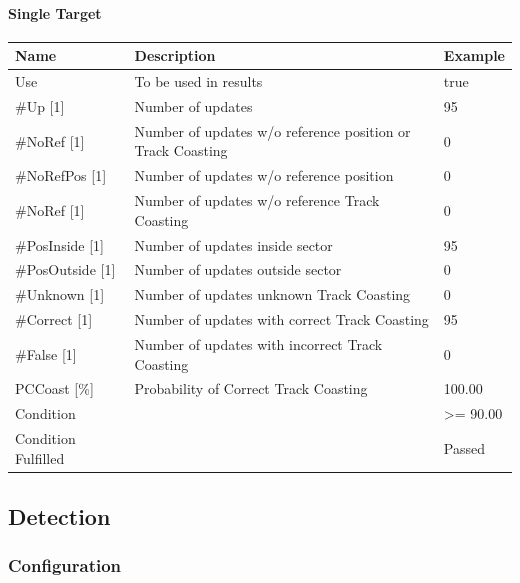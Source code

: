 \paragraph{Single Target}

\begin{center}
 \begin{table}[H]
  \begin{tabularx}{\textwidth}{ | l | X |  l | }
    \hline
    \textbf{Name} & \textbf{Description} & \textbf{Example} \\ \hline
  Use & To be used in results & true \\ \hline
  \#Up [1] & Number of updates & 95 \\ \hline
  \#NoRef [1] & Number of updates w/o reference position or Track Coasting & 0 \\ \hline
  \#NoRefPos [1] & Number of updates w/o reference position  & 0 \\ \hline
  \#NoRef [1] & Number of updates w/o reference Track Coasting & 0 \\ \hline
  \#PosInside [1] & Number of updates inside sector & 95 \\ \hline
  \#PosOutside [1] & Number of updates outside sector & 0 \\ \hline
  \#Unknown [1] & Number of updates unknown Track Coasting & 0 \\ \hline
  \#Correct [1] & Number of updates with correct Track Coasting & 95 \\ \hline
  \#False [1] & Number of updates with incorrect Track Coasting & 0 \\ \hline
  PCCoast [\%] & Probability of Correct Track Coasting & 100.00 \\ \hline
  Condition &  & >= 90.00 \\ \hline
  Condition Fulfilled &  & Passed \\ \hline
\end{tabularx}
\end{table}
\end{center}


\subsection{Detection}
\label{sec:eval_req_detection} 

\subsubsection{Configuration}

